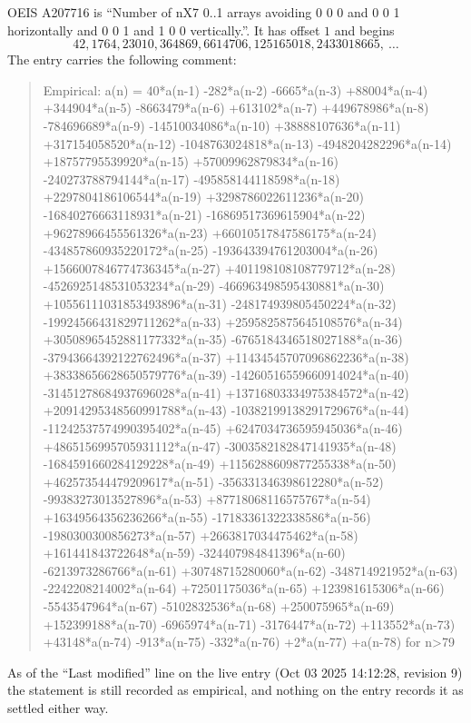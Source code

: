 \documentclass[11pt,a4paper]{article}
\theoremstyle{plain}
\theoremstyle{definition}
\begin{document}
OEIS A207716 is ``Number of nX7 0..1 arrays avoiding 0 0 0 and 0 0 1 horizontally and 0 0 1 and 1 0 0 vertically.''. It has offset
$1$ and begins
\[
42, 1764, 23010, 364869, 6614706, 125165018, 2433018665,\ \dots
\]
The entry carries the following comment:
\begin{quote}\small
Empirical: a(n) = 40*a(n-1) -282*a(n-2) -6665*a(n-3) +88004*a(n-4) +344904*a(n-5) -8663479*a(n-6) +613102*a(n-7) +449678986*a(n-8) -784696689*a(n-9) -14510034086*a(n-10) +38888107636*a(n-11) +317154058520*a(n-12) -1048763024818*a(n-13) -4948204282296*a(n-14) +18757795539920*a(n-15) +57009962879834*a(n-16) -240273788794144*a(n-17) -495858144118598*a(n-18) +2297804186106544*a(n-19) +3298786022611236*a(n-20) -16840276663118931*a(n-21) -16869517369615904*a(n-22) +96278966455561326*a(n-23) +66010517847586175*a(n-24) -434857860935220172*a(n-25) -193643394761203004*a(n-26) +1566007846774736345*a(n-27) +401198108108779712*a(n-28) -4526925148531053234*a(n-29) -466963498595430881*a(n-30) +10556111031853493896*a(n-31) -248174939805450224*a(n-32) -19924566431829711262*a(n-33) +2595825875645108576*a(n-34) +30508965452881177332*a(n-35) -6765184346518027188*a(n-36) -37943664392122762496*a(n-37) +11434545707096862236*a(n-38) +38338656628650579776*a(n-39) -14260516559660914024*a(n-40) -31451278684937696028*a(n-41) +13716803334975384572*a(n-42) +20914295348560991788*a(n-43) -10382199138291729676*a(n-44) -11242537574990395402*a(n-45) +6247034736595945036*a(n-46) +4865156995705931112*a(n-47) -3003582182847141935*a(n-48) -1684591660284129228*a(n-49) +1156288609877255338*a(n-50) +462573544479209617*a(n-51) -356331346398612280*a(n-52) -99383273013527896*a(n-53) +87718068116575767*a(n-54) +16349564356236266*a(n-55) -17183361322338586*a(n-56) -1980300300856273*a(n-57) +2663817034475462*a(n-58) +161441843722648*a(n-59) -324407984841396*a(n-60) -6213973286766*a(n-61) +30748715280060*a(n-62) -348714921952*a(n-63) -2242208214002*a(n-64) +72501175036*a(n-65) +123981615306*a(n-66) -5543547964*a(n-67) -5102832536*a(n-68) +250075965*a(n-69) +152399188*a(n-70) -6965974*a(n-71) -3176447*a(n-72) +113552*a(n-73) +43148*a(n-74) -913*a(n-75) -332*a(n-76) +2*a(n-77) +a(n-78) for n>79
\end{quote}
As of the ``Last modified'' line on the live entry (Oct 03 2025 14:12:28, revision
9) the statement is still recorded as empirical, and nothing on the entry
records it as settled either way.
\end{document}
